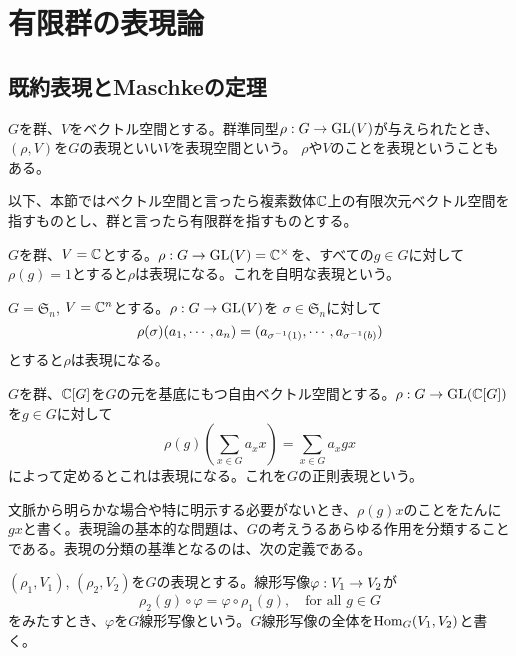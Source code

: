 \documentclass{ltjsreport}
\begin{document}
\section{有限群の表現論}
\subsection{既約表現とMaschkeの定理}

\begin{defin}
  $G$を群、$V$をベクトル空間とする。群準同型$\rho:G\rightarrow\text{GL}(V)$が与えられたとき、$(\rho,V)$を$G$の表現といい$V$を表現空間という。
  $\rho$や$V$のことを表現ということもある。
\end{defin} 

以下、本節ではベクトル空間と言ったら複素数体$\mathbb{C}$上の有限次元ベクトル空間を指すものとし、群と言ったら有限群を指すものとする。

\begin{eg}
  $G$を群、$V=\mathbb{C}$とする。$\rho:G\rightarrow \text{GL}(V)=\mathbb{C}^\times$を、すべての$g\in G$に対して$\rho(g)=1$とすると$\rho$は表現になる。これを自明な表現という。
\end{eg}

\begin{eg}\label{natural}
  $G=\mathfrak{S}_n$, $V=\mathbb{C}^n$とする。$\rho:G\rightarrow \text{GL}(V)$を
  $\sigma\in\mathfrak{S}_n$に対して
  \[
  \rho(\sigma)(a_1,\cdots,a_n)=(a_{\sigma^{-1}(1)},\cdots,a_{\sigma^{-1}(b)})  
  \]
  とすると$\rho$は表現になる。
\end{eg}

\begin{eg}\label{regular}
  $G$を群、$\mathbb{C}[G]$を$G$の元を基底にもつ自由ベクトル空間とする。$\rho:G\rightarrow\text{GL}(\mathbb{C}[G])$を$g\in G$に対して
  \[
  \rho(g)\left(\sum_{x\in G}a_xx\right)=\sum_{x\in G}a_xgx  
  \]
  によって定めるとこれは表現になる。これを$G$の正則表現という。
\end{eg}

文脈から明らかな場合や特に明示する必要がないとき、$\rho(g)x$のことをたんに$gx$と書く。表現論の基本的な問題は、$G$の考えうるあらゆる作用を分類することである。表現の分類の基準となるのは、次の定義である。

\begin{defin}
  $(\rho_1,V_1)$, $(\rho_2,V_2)$を$G$の表現とする。線形写像$\varphi:V_1\rightarrow V_2$が
  \[
  \rho_2(g)\circ\varphi=\varphi\circ\rho_1(g),\quad \text{for all $g\in G$}
  \]
  をみたすとき、$\varphi$を$G$線形写像という。$G$線形写像の全体を$\text{Hom}_G(V_1,V_2)$と書く。
\end{defin}
\end{document}
